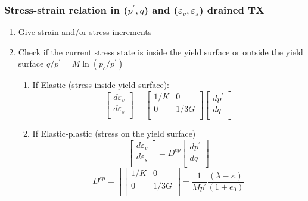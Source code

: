 \documentclass[notes]{beamer}
\begin{document}
\begin{frame}
\frametitle{Stress-strain relation in ($p^\prime, q$) and ($\varepsilon_v, \varepsilon_s$) drained TX}
\begin{enumerate}
	\item Give strain and/or stress increments
	\item Check if the current stress state is inside the yield surface or outside the yield surface $q/p^\prime = M \ln (p_c/p^\prime)$
	\begin{enumerate}
		\item If Elastic (stress inside yield surface):
			\begin{equation*}
			\begin{bmatrix}
				d\varepsilon_v \\
				d\varepsilon_s \\
			\end{bmatrix} = %
			\begin{bmatrix}
				1/K & 0 \\
				0 & 1/3G\\
			\end{bmatrix} %
			\begin{bmatrix}
				dp^\prime \\
				dq\\
			\end{bmatrix}
			\end{equation*}
		\item If Elastic-plastic (stress on the yield surface)
			\begin{equation*}
			\begin{bmatrix}
				d\varepsilon_v \\
				d\varepsilon_s \\
			\end{bmatrix} = %
			D^{ep}
			\begin{bmatrix}
				dp^\prime \\
				dq\\
			\end{bmatrix}
			\end{equation*}		
			\begin{equation*}
			D^{ep} =\left[
			\begin{bmatrix}
				1/K & 0 \\
				0 & 1/3G\\
			\end{bmatrix} + %
			\frac{1}{Mp^\prime}%
			\frac{(\lambda - \kappa)}{(1+e_0)}%

\end{equation*}
\end{enumerate}
\end{enumerate}
\end{frame}
\end{document}
